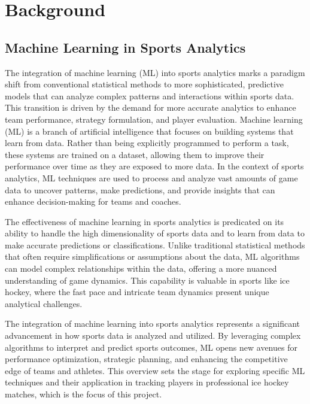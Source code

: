 \documentclass[12pt, letterpaper]{article}
\begin{document}
\section{Background}
{
\setlength{\parskip}{0.3cm}
\subsection{Machine Learning in Sports Analytics}
\begin{spacing}{1.2}
The integration of machine learning (ML) into sports analytics marks a paradigm shift from conventional statistical methods to more sophisticated, predictive models that can analyze complex patterns and interactions within sports data. This transition is driven by the demand for more accurate analytics to enhance team performance, strategy formulation, and player evaluation. Machine learning (ML) is a branch of artificial intelligence that focuses on building systems that learn from data. Rather than being explicitly programmed to perform a task, these systems are trained on a dataset, allowing them to improve their performance over time as they are exposed to more data. In the context of sports analytics, ML techniques are used to process and analyze vast amounts of game data to uncover patterns, make predictions, and provide insights that can enhance decision-making for teams and coaches.

The effectiveness of machine learning in sports analytics is predicated on its ability to handle the high dimensionality of sports data and to learn from data to make accurate predictions or classifications. Unlike traditional statistical methods that often require simplifications or assumptions about the data, ML algorithms can model complex relationships within the data, offering a more nuanced understanding of game dynamics. This capability is valuable in sports like ice hockey, where the fast pace and intricate team dynamics present unique analytical challenges.

The integration of machine learning into sports analytics represents a significant advancement in how sports data is analyzed and utilized. By leveraging complex algorithms to interpret and predict sports outcomes, ML opens new avenues for performance optimization, strategic planning, and enhancing the competitive edge of teams and athletes. This overview sets the stage for exploring specific ML techniques and their application in tracking players in professional ice hockey matches, which is the focus of this project.


\end{spacing}}
\end{document}
